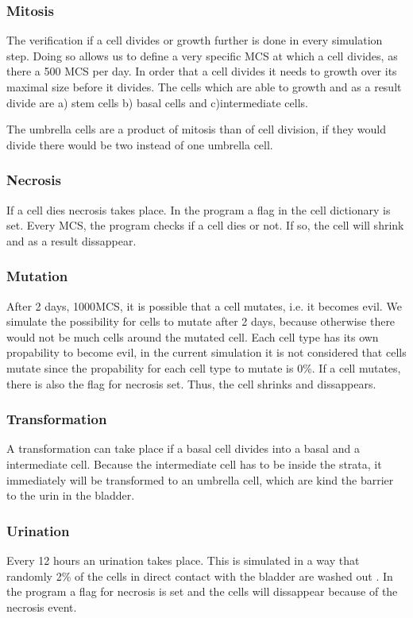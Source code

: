 \subsubsection{Mitosis}
The verification if a cell divides or growth further is done in every simulation step. Doing so allows us to define a very specific \ac{MCS} at which a cell divides, as there a 500 \ac{MCS} per day. In order that a cell divides it needs to growth over its maximal size before it divides.
The cells which are able to growth and as a result divide are a) stem cells b) basal cells and c)intermediate cells. 

The umbrella cells are a product of mitosis than of cell division, if they would divide there would be two instead of one umbrella cell.

\subsubsection{Necrosis}
If a cell dies necrosis takes place. In the program a flag in the cell dictionary is set. Every \ac{MCS}, the program checks if a cell dies or not. If so, the cell will shrink and as a result dissappear.

\subsubsection{Mutation}
After 2 days, 1000\ac{MCS}, it is possible that a cell mutates, i.e. it becomes evil. We simulate the possibility for cells to mutate after 2 days, because otherwise there would not be much cells around the mutated cell. Each cell type has its own propability to become evil, in the current simulation it is not considered that cells mutate since the propability for each cell type to mutate is 0\%. \newline
If a cell mutates, there is also the flag for necrosis set. Thus, the cell shrinks and dissappears.


\subsubsection{Transformation}
A transformation can take place if a basal cell divides into a basal and a intermediate cell. Because the intermediate cell has to be inside the strata, it immediately will be transformed to an umbrella cell, which are kind the barrier to the urin in the bladder. 


\subsubsection{Urination}
Every 12 hours an urination takes place. This is simulated in a way that randomly 2\% of the cells in direct contact with the bladder are washed out \cite{Torelli2017}. In the program a flag for necrosis is set and the cells will dissappear because of the necrosis event.








